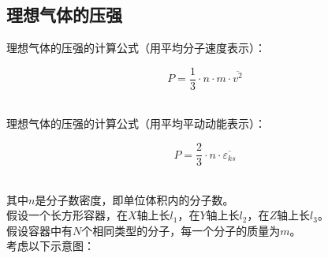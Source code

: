 \documentclass[UTF8]{ctexart}
\begin{document}
\subsection{理想气体的压强}
    \setcounter{equation}{0}
    理想气体的压强的计算公式（用平均分子速度表示）：
    \begin{large}
        \begin{equation*}
            P=\frac{1}{3}\cdot n\cdot m\cdot\overline{v^2}    
        \end{equation*}
    \end{large}\\
    理想气体的压强的计算公式（用平均平动动能表示）：
    \begin{large}
        \begin{equation*}
            P=\frac{2}{3}\cdot n\cdot\overline{\varepsilon_{ks}}
        \end{equation*}
    \end{large}\\
    其中$n$是分子数密度，即单位体积内的分子数。\\[6mm]
    假设一个长方形容器，在$X$轴上长$l_1$，在$Y$轴上长$l_2$，在$Z$轴上长$l_3$。\\[3mm]
    假设容器中有$N$个相同类型的分子，每一个分子的质量为$m$。\\[3mm]
    考虑以下示意图：\vspace{5pt}
\end{document}
